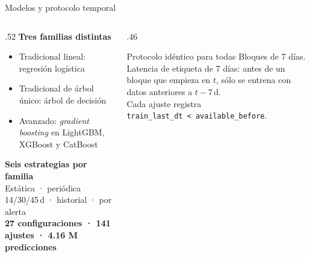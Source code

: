 \documentclass[aspectratio=169,10pt]{beamer}
\begin{document}
\begin{frame}{Modelos y protocolo temporal}\small
\begin{columns}[T]
\begin{column}{.52\linewidth}
\textbf{Tres familias distintas}
\begin{itemize}\itemsep2pt
\item Tradicional lineal: regresión logística
\item Tradicional de árbol único: árbol de decisión
\item Avanzado: \emph{gradient boosting} en LightGBM, XGBoost y CatBoost
\end{itemize}
\vspace{3mm}
\textbf{Seis estrategias por familia}\\
Estática · periódica 14/30/45\,d · historial · por alerta\\[2mm]
\textbf{27 configuraciones · 141 ajustes · 4.16 M predicciones}
\end{column}
\begin{column}{.46\linewidth}
\begin{block}{Protocolo idéntico para todas}
Bloques de 7 días.\\
Latencia de etiqueta de 7 días: antes de un bloque que empieza en $t$, sólo se entrena con datos anteriores a $t-7$\,d.\\[2mm]
Cada ajuste registra\\ \texttt{train\_last\_dt < available\_before}.
\end{block}
\end{column}
\end{columns}
\end{frame}
\end{document}
